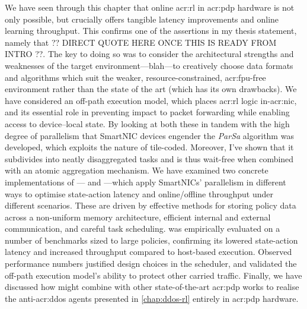 We have seen through this chapter that online \gls{acr:rl} in \gls{acr:pdp} hardware is not only possible, but crucially offers tangible latency improvements and online learning throughput.
This confirms one of the assertions in my thesis statement, namely that ?? DIRECT QUOTE HERE ONCE THIS IS READY FROM INTRO ??.
The key to doing so was to consider the architectural strengths and weaknesses of the target environment---blah---to creatively choose data formats and algorithms which suit the weaker, resource-constrained, \gls{acr:fpu}-free environment rather than the state of the art (which has its own drawbacks).
We have considered an off-path execution model, which places \gls{acr:rl} logic in-\gls{acr:nic}, and its essential role in preventing impact to packet forwarding while enabling access to device--local state.
By looking at both these in tandem with the high degree of parallelism that SmartNIC devices engender the \emph{ParSa} algorithm was developed, which exploits the nature of tile-coded.
Moreover, I've shown that it subdivides into neatly disaggregated tasks and is thus wait-free when combined with an atomic aggregation mechanism.
We have examined two concrete implementations of \approachshort{}---\indfw{} and \coopfw---which apply SmartNICs' parallelism in different ways to optimise state-action latency and online/offline throughput under different scenarios.
These are driven by effective methods for storing policy data across a non-uniform memory architecture, efficient internal and external communication, and careful task scheduling.
\approachshort{} was empirically evaluated on a number of benchmarks sized to large policies, confirming its lowered state-action latency and increased throughput compared to host-based execution.
Observed performance numbers justified design choices in the scheduler, and validated the off-path execution model's ability to protect other carried traffic.
Finally, we have discussed how \approachshort{} might combine with other state-of-the-art \gls{acr:pdp} works to realise the anti-\gls{acr:ddos} agents presented in \cref{chap:ddos-rl} entirely in \gls{acr:pdp} hardware.

